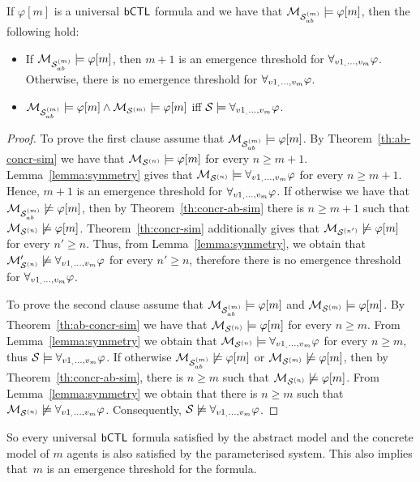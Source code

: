 \begin{corollary}
\label{cor:universal}
If $\varphi[m]$ is a universal $\sf{bCTL}$ formula and we have that $\mathcal{M}_{\mathcal{S}_{ab}^{(m)}}
\models  \varphi[m]$, then the following hold:
\begin{itemize}
    \item  If $\mathcal{M}_{\mathcal{S}_{ab}^{(m)}} \models \varphi[m]$, then $m + 1$ is an emergence
    threshold for $\forall_{v1_,\ldots,v_m} \varphi$. Otherwise, there is no emergence threshold for
    $\forall_{v1_,\ldots,v_m} \varphi$.
    \item $\mathcal{M}_{\mathcal{S}_{ab}^{(m)}} \models \varphi[m] \land \mathcal{M}_{\mathcal{S}^{(m)}} \models \varphi[m]$ iff
    $\mathcal S \models \forall_{v1_,\ldots,v_m} \varphi$.
\end{itemize}
\end{corollary}
\begin{proof}
To prove the first clause assume that $\mathcal{M}_{\mathcal{S}_{ab}^{(m)}} \models \varphi[m]$. By
Theorem~\ref{th:ab-concr-sim} we have that $\mathcal{M}_{\mathcal{S}^{(n)}} \models \varphi[m]$ for
every $n \geq m+1$. Lemma~\ref{lemma:symmetry} gives that  $\mathcal{M}_{\mathcal{S}^{(n)}} \models
\forall_{v1_,\ldots,v_m} \varphi$ for every $n \geq m+1$. Hence, $m+1$ is an emergence threshold for
$\forall_{v1_,\ldots,v_m} \varphi$. If otherwise we have that  $\mathcal{M}_{\mathcal{S}_{ab}^{(m)}} \not \models \varphi[m]$,
then by Theorem~\ref{th:concr-ab-sim} there is $n \geq m+1$ such that $\mathcal{M}_{\mathcal{S}^{(n)}}
\not \models \varphi[m]$. Theorem~\ref{th:concr-sim} additionally gives that
$\mathcal{M}_{\mathcal{S}^{(n')}} \not \models \varphi[m]$ for every $n' \geq n$. Thus, from
Lemma~\ref{lemma:symmetry}, we obtain that $\mathcal{M}_{\mathcal{S}^{(n)}}' \not \models \forall_{v1_,\ldots,v_m} \varphi$
for every $n' \geq n$, therefore there is no emergence threshold for
$\forall_{v1_,\ldots,v_m} \varphi$.

To prove the second clause assume that $\mathcal{M}_{\mathcal{S}_{ab}^{(m)}} \models \varphi[m]$ and $\mathcal{M}_{\mathcal{S}^{(m)}} \models \varphi[m]$. By Theorem~\ref{th:ab-concr-sim} we have that $\mathcal{M}_{\mathcal{S}^{(n)}}
\models \varphi[m]$ for every $n \geq m$. From Lemma~\ref{lemma:symmetry} we
obtain that $\mathcal{M}_{\mathcal{S}^{(n)}} \models \forall_{v1_,\ldots,v_m} \varphi$ for every $n \geq m$, thus $\mathcal S
\models \forall_{v1_,\ldots,v_m} \varphi$. If otherwise $\mathcal{M}_{\mathcal{S}_{ab}^{(m)}} \not \models \varphi[m]$ or $\mathcal{M}_{\mathcal{S}^{(m)}}
\not \models \varphi[m]$, then by Theorem~\ref{th:concr-ab-sim}, there is $n
\geq m$ such that $\mathcal{M}_{\mathcal{S}^{(n)}} \not \models \varphi[m]$.  From
Lemma~\ref{lemma:symmetry} we obtain that there is $n \geq m$ such that $\mathcal{M}_{\mathcal{S}^{(n)}}
\not \models \forall_{v1_,\ldots,v_m} \varphi$. Consequently, $\mathcal S \not \models \forall_{v1_,\ldots,v_m} \varphi$.
\end{proof}

So every universal $\sf{bCTL}$ formula satisfied by the abstract model
and the concrete model of $m$ agents is also satisfied by the parameterised
system. This also implies that~$m$ is an emergence threshold for the formula.

